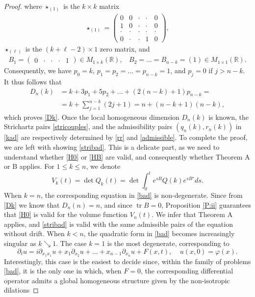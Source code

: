 \documentclass[11pt,letter]{amsart}
\def \R {\mathbb{R}}
\def \vf{\varphi}
\newcommand{\p}{\partial}
\numberwithin{equation}{section}
\newcommand{\tr}{\operatorname{tr}}
\numberwithin{equation}{section}
\begin{document}
\begin{proof}
where 
$\star_{(1)}$ is the $k\times k$ matrix 
\begin{align*}
\star_{(1)}=\begin{pmatrix}
0 & 0 & \cdot & \cdot & 0 \\
1 & 0 & \cdot & \cdot & 0 \\
\cdot & \cdot & \cdot & \cdot & \cdot \\
0 & \cdot & \cdot &  1 & 0
\end{pmatrix},
\end{align*}
$\star_{(\ell)}$ is the $(k+\ell-2)\times 1$ zero matrix, and
\begin{align*}
B_{1}=\begin{pmatrix}
0 & \cdot & \cdot & \cdot & 1
\end{pmatrix} \in M_{1\times k}(\R),\ \ \ \  B_{2}=...=B_{n-k}= (1)\in M_{1\times 1}(\R).
\end{align*}
Consequently, we have $p_{0}=k$, $p_{1}=p_{2}=...=p_{n-k}=1$, and $p_{j}=0$ if $j>n-k$. It thus follows that 
\begin{align*}
D_{n}(k)&=k+3p_{1}+5p_{2}+...+(2(n-k)+1)p_{n-k}=\\
&=k+\sum_{j=1}^{n-k}(2j+1)=n+(n-k+1)(n-k),
\end{align*}
which proves \eqref{Dk}. Once the local homogeneous dimension $D_n(k)$ is known, the Strichartz pairs \eqref{stricouples}, and the admissibility pairs $(q_n(k),r_n(k))$ in \eqref{kad} are respectively determined by \eqref{rr} and \eqref{admissible}. To complete the proof, we are left with showing \eqref{stribad}. This is a delicate part, as we need to understand whether \eqref{H0} or \eqref{HB} are valid, and consequently whether Theorem A or B applies. For $1\le k\le n$, we denote 
\[
V_k(t) = \det Q_k(t) = \det \int_0^t e^{sB} Q(k) e^{sB^\star} ds.
\]
When $k = n$, the corresponding equation in \eqref{bad} is non-degenerate. Since from \eqref{Dk} we know that $D_n(n) = n$, and since $\tr B = 0$, Proposition \ref{P:ii} guarantees that \eqref{H0} is valid for the volume function $V_n(t)$. We infer that Theorem A applies, and \eqref{stribad} is valid with the same admissible pairs of the equation without drift.
When $k<n$, the quadratic form in \eqref{bad} becomes increasingly singular as $k\searrow 1$. The case $k=1$ is the most degenerate, corresponding to 
\begin{equation}\label{badd}
\p_t u = i \p_{x_1x_1} u + x_1 \p_{x_2} u + . . . + x_{n-1} \p_{x_n} u + F(x,t),\ \ \ \ \ u(x,0) = \vf(x).
\end{equation}  
Interestingly, this case is the easiest to decide since, within the family of problems \eqref{bad}, it is the only one in which, when $F=0$, the corresponding differential operator admits a global homogeneous structure given by the non-isotropic dilations  

\end{proof}
\end{document}
